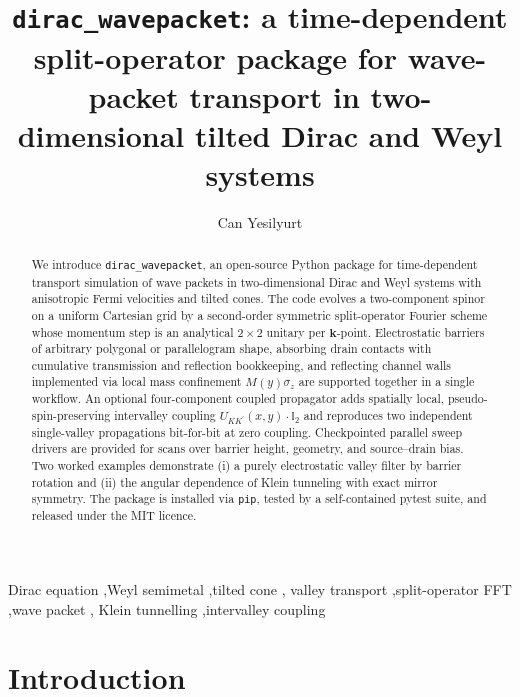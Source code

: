 \documentclass[preprint, 11pt]{elsarticle}
\newcommand{\dirac}{\texttt{dirac\_wavepacket}\xspace}
\begin{document}
\begin{frontmatter}

\title{\texttt{dirac\_wavepacket}: a time-dependent split-operator package for
       wave-packet transport in two-dimensional tilted Dirac and Weyl
       systems}

\author[nrc]{Can Yesilyurt}


\address[nrc]{Nanoelectronics Research Center, Istanbul, Turkey}

\begin{abstract}
We introduce \dirac, an open-source Python package for time-dependent
transport simulation of wave packets in two-dimensional Dirac and Weyl
systems with anisotropic Fermi velocities and tilted cones. The code
evolves a two-component spinor on a uniform Cartesian grid by a
second-order symmetric split-operator Fourier scheme whose momentum
step is an analytical $2\times2$ unitary per $\mathbf{k}$-point.
Electrostatic barriers of arbitrary polygonal or parallelogram shape,
absorbing drain contacts with cumulative transmission and reflection
bookkeeping, and reflecting channel walls implemented via local mass
confinement $M(y)\sigma_z$ are supported together in a single
workflow. An optional four-component coupled propagator adds
spatially local, pseudo-spin-preserving intervalley coupling
$U_{KK^\prime}(x,y)\cdot\mathbb{I}_2$ and reproduces two independent
single-valley propagations bit-for-bit at zero coupling.
Checkpointed parallel sweep drivers are provided for scans over
barrier height, geometry, and source--drain bias. Two worked examples
demonstrate (i) a purely electrostatic valley filter by barrier
rotation and (ii) the angular dependence of Klein tunneling with
exact mirror symmetry. The package is installed via \texttt{pip},
tested by a self-contained pytest suite, and released under the MIT
licence.
\end{abstract}

\begin{keyword}
Dirac equation \sep Weyl semimetal \sep tilted cone \sep
valley transport \sep split-operator FFT \sep wave packet \sep
Klein tunnelling \sep intervalley coupling
\end{keyword}

\end{frontmatter}

\section{Introduction}
\label{sec:intro}
\end{document}
